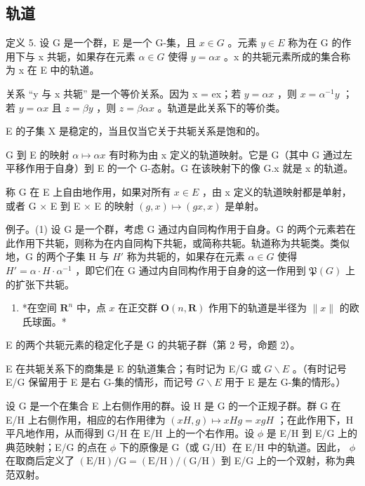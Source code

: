 \subsection{轨道}

定义 5. 设 G 是一个群，E 是一个 G-集，且 \(x \in G\) 。元素 \(y \in E\) 称为在 G 的作用下与 x 共轭，如果存在元素 \(\alpha \in G\) 使得 \(y = \alpha x\) 。x 的共轭元素所成的集合称为 x 在 E 中的轨道。

关系 “y 与 x 共轭” 是一个等价关系。因为 x = ex；若 \(y = \alpha x\) ，则 \(x = \alpha^{-1} y\) ；若 \(y = \alpha x\) 且 \(z = \beta y\) ，则 \(z = \beta \alpha x\) 。轨道是此关系下的等价类。

E 的子集 X 是稳定的，当且仅当它关于共轭关系是饱和的。

G 到 E 的映射 \(\alpha\mapsto\alpha x\) 有时称为由 x 定义的轨道映射。它是 G（其中 G 通过左平移作用于自身）到 E 的一个 G-态射。G 在该映射下的像 G.x 就是 x 的轨道。

称 G 在 E 上自由地作用，如果对所有 \(x \in E\) ，由 x 定义的轨道映射都是单射，或者 G × E 到 E × E 的映射 \((g, x) \mapsto (gx, x)\) 是单射。

例子。(1) 设 G 是一个群，考虑 G 通过内自同构作用于自身。G 的两个元素若在此作用下共轭，则称为在内自同构下共轭，或简称共轭。轨道称为共轭类。类似地，G 的两个子集 H 与 \(H'\) 称为共轭的，如果存在元素 \(\alpha \in G\) 使得 \(H' = \alpha \cdot H \cdot \alpha^{-1}\) ，即它们在 G 通过内自同构作用于自身的这一作用到 \(\mathfrak{P}(G)\) 上的扩张下共轭。

\begin{enumerate}
\def\labelenumi{(\arabic{enumi})}
\setcounter{enumi}{1}
\tightlist
\item
  *在空间 \(\mathbf{R}^n\) 中，点 \(x\) 在正交群 \(\mathbf{O}(n, \mathbf{R})\) 作用下的轨道是半径为 \(\| x \|\) 的欧氏球面。*
\end{enumerate}

E 的两个共轭元素的稳定化子是 G 的共轭子群（第 2 号，命题 2）。

E 在共轭关系下的商集是 E 的轨道集合；有时记为 E/G 或 \(G\backslash E\) 。（有时记号 E/G 保留用于 E 是右 G-集的情形，而记号 \(G\backslash E\) 用于 E 是左 G-集的情形。）

设 G 是一个在集合 E 上右侧作用的群。设 H 是 G 的一个正规子群。群 G 在 E/H 上右侧作用，相应的右作用律为 \((xH, g) \mapsto xHg = xgH\) ；在此作用下，H 平凡地作用，从而得到 G/H 在 E/H 上的一个右作用。设 \(\phi\) 是 E/H 到 E/G 上的典范映射；E/G 的点在 \(\phi\) 下的原像是 G（或 G/H）在 E/H 中的轨道。因此， \(\phi\) 在取商后定义了 \((\mathrm{E}/\mathrm{H})/\mathrm{G} = (\mathrm{E}/\mathrm{H})/(\mathrm{G}/\mathrm{H})\) 到 E/G 上的一个双射，称为典范双射。


